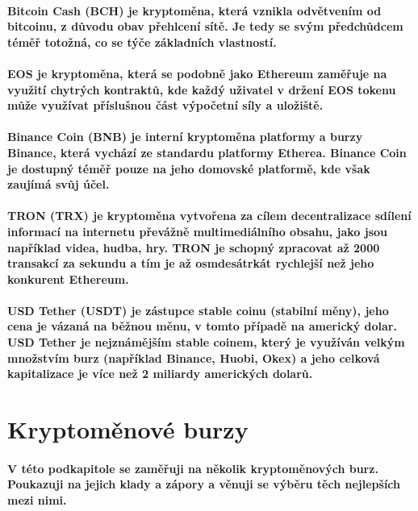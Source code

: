 \documentclass[thesis=B,czech]{FITthesis}[2019/03/21]
\begin{document}
\paragraph{
Bitcoin Cash (BCH) je kryptoměna, která vznikla odvětvením od bitcoinu, z důvodu obav přehlcení sítě. Je tedy se svým předchůdcem téměř totožná, co se týče základních vlastností. \cite{kurzy_bch}
}
\paragraph{
EOS je kryptoměna, která se podobně jako Ethereum zaměřuje na využití chytrých kontraktů, kde každý uživatel v držení EOS tokenu může využívat příslušnou část výpočetní síly a uložiště. \cite{finex_eos}
}
\paragraph{
Binance Coin (BNB) je interní kryptoměna platformy a burzy Binance, která vychází ze standardu platformy Etherea. Binance Coin je dostupný téměř pouze na jeho domovské platformě, kde však zaujímá svůj účel. \cite{martin_sistek_bnb}
}
\paragraph{
TRON (TRX) je kryptoměna vytvořena za cílem decentralizace sdílení informací na internetu převážně multimediálního obsahu, jako jsou například videa, hudba, hry. TRON je schopný zpracovat až 2000 transakcí za sekundu a tím je až osmdesátrkát rychlejší než jeho konkurent Ethereum. \cite{finex_trx}
}
\paragraph{
USD Tether (USDT) je zástupce stable coinu (stabilní měny), jeho cena je vázaná na běžnou měnu, v tomto případě na americký dolar. USD Tether je nejznámějším stable coinem, který je využíván velkým množstvím burz (například Binance, Huobi, Okex) a jeho celková kapitalizace je více než 2 miliardy amerických dolarů. \cite{mlady_investor_stable_coin} 
}
\section{Kryptoměnové burzy}
\label{cryptocurrency_exchanges}
\paragraph{
V této podkapitole se zaměřuji na několik kryptoměnových burz. Poukazuji na jejich klady a zápory a věnuji se výběru těch nejlepších mezi nimi.
}
\end{document}
